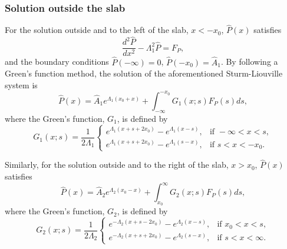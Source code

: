\documentclass{aastex61}
\begin{document}
\subsubsection{Solution outside the slab}
For the solution outside and to the left of the slab, $x < -x_0$, $\hat{P}(x)$ satisfies
\begin{equation}
\frac{d^2\hat{P}}{dx^2} - \Lambda_1^2 \hat{P} = F_P,
\end{equation}
and the boundary conditions $\hat{P}(-\infty) = 0$, $\hat{P}(-x_0) = \hat{A}_1$. By following a Green's function method, the solution of the aforementioned Sturm-Liouville system is
\begin{equation}
\hat{P}(x) = \hat{A}_1e^{\Lambda_1(x_0+x)} + \int_{-\infty}^{-x_0} G_1(x;s) F_P(s) ds,
\label{P sol 1}
\end{equation}
where the Green's function, $G_1$, is defined by
\begin{equation}
G_1(x;s) = \frac{1}{2\Lambda_1}
\begin{cases}
e^{\Lambda_1(x+s+2x_0)} - e^{\Lambda_1(x-s)}, & \text{if } -\infty<x<s, \\
e^{\Lambda_1(x+s+2x_0)} - e^{\Lambda_1(s-x)}, & \text{if } s<x<-x_0.
\end{cases}
\end{equation}

Similarly, for the solution outside and to the right of the slab, $x > x_0$, $\hat{P}(x)$ satisfies
\begin{equation}
\hat{P}(x) = \hat{A}_2e^{\Lambda_2(x_0-x)} + \int_{x_0}^{\infty} G_2(x;s) F_P(s) ds,
\label{P sol 2}
\end{equation}
where the Green's function, $G_2$, is defined by
\begin{equation}
G_2(x;s) = \frac{1}{2\Lambda_2}
\begin{cases}
e^{-\Lambda_2(x+s-2x_0)} - e^{\Lambda_2(x-s)}, & \text{if } x_0<x<s, \\
e^{-\Lambda_2(x+s+2x_0)} - e^{\Lambda_2(s-x)}, & \text{if } s<x<\infty.
\end{cases}
\end{equation}
\end{document}
